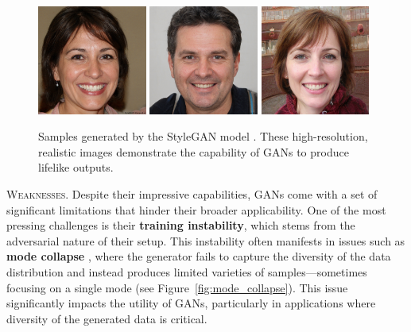 \begin{figure}[ht]
    \centering
    \includegraphics[width=0.32\textwidth]{introduction/figures/stylegan_example_1.jpeg}
    \includegraphics[width=0.32\textwidth]{introduction/figures/stylegan_example_2.jpeg}
    \includegraphics[width=0.32\textwidth]{introduction/figures/stylegan_example_3.jpeg}
    \caption{Samples generated by the StyleGAN model \cite{karras2019stylegan}. These high-resolution, realistic images demonstrate the capability of GANs to produce lifelike outputs.}
    \label{fig:stylegan_samples}
\end{figure}

\textsc{Weaknesses.} Despite their impressive capabilities, GANs come with a set of significant limitations that hinder their broader applicability. One of the most pressing challenges is their \textbf{training instability}, which stems from the adversarial nature of their setup. This instability often manifests in issues such as \textbf{mode collapse} \citep{arjovsky2017wasserstein}, where the generator fails to capture the diversity of the data distribution and instead produces limited varieties of samples—sometimes focusing on a single mode (see Figure~\ref{fig:mode_collapse}). This issue significantly impacts the utility of GANs, particularly in applications where diversity of the generated data is critical.

